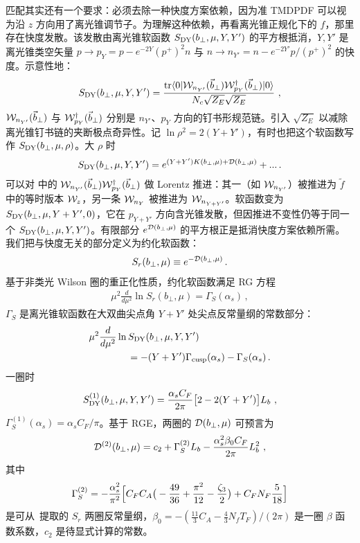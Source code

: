 匹配其实还有一个要求：必须去除一种快度方案依赖，因为准 TMDPDF 可以视为沿 $z$ 方向用了离光锥调节子。为理解这种依赖，再看离光锥正规化下的 $f$，那里存在快度发散。该发散由离光锥软函数 $S_{\rm DY}(b_\perp,\mu,Y,Y')$ 的平方根抵消，$Y,Y'$ 是离光锥类空矢量 $p\rightarrow p_Y= p-e^{-2Y}(p^+)^2n $ 与 $n \rightarrow n_{Y'}=n-e^{-2Y'}p/(p^+)^2$ 的快度。示意性地：
\begin{align}\label{eq:S_DY}
	S_{\rm DY}(b_\perp,\mu,Y,Y')= \frac{{\rm tr}\langle 0|{\cal W}_{n_{Y'}}(\vec{b}_\perp) {\cal W}^{\dagger}_{p_Y}(\vec{b}_\perp)|0\rangle}{N_c\sqrt{Z_E}\sqrt{Z_E}}  \ ,
\end{align}
${\cal W}_{n_{Y'}}(\vec{b}_\perp)$ 与 ${\cal W}^{\dagger}_{p_Y}(\vec{b}_\perp)$ 分别是 $n_{Y'}$、$p_Y$ 方向的钉书形规范链。引入 $\sqrt{Z_E}$ 以减除离光锥钉书链的夹断极点奇异性。记 $\ln \rho^2=2(Y+Y')$，有时也把这个软函数写作 $S_{\rm DY}(b_\perp,\mu,\rho)$。大 $\rho $ 时
\begin{align}
	S_{\rm DY}(b_\perp,\mu,Y,Y')= e^{(Y+Y') K(b_\perp,\mu)+{\cal D}(b_\perp,\mu)}+... \,.
\end{align}
可以对  中的 ${\cal W}_{n_{Y'}}(\vec{b}_\perp) {\cal W}^{\dagger}_{p_Y}(\vec{b}_\perp)$ 做 Lorentz 推进：其一（如 ${\cal W}_{n_{Y'}}$）被推进为 $\tilde f$ 中的等时版本 ${\cal W}_z$，另一条 ${\cal W}_{n_{Y}}$ 被推进为 ${\cal W}_{n_{Y+Y'}}$。软函数变为 $S_{\rm DY}(b_\perp,\mu,Y+Y',0)$，它在 $p_{Y+Y'}$ 方向含光锥发散，但因推进不变性仍等于同一个 $S_{\rm DY}(b_\perp,\mu,Y,Y')$。有限部分 $e^{{\cal D}(b_\perp,\mu)}$
的平方根正是抵消快度方案依赖所需。我们把与快度无关的部分定义为约化软函数：
\begin{align}\label{eq:reduced}
	S_r(b_\perp,\mu)\equiv e^{-{\cal D}(b_\perp,\mu)} \,.
\end{align}
基于非类光 Wilson 圈的重正化性质，约化软函数满足 RG 方程
\begin{align}
	\mu^2 \frac{d}{d\mu^2} \ln S_r(b_\perp,\mu)=\Gamma_S(\alpha_s) \,,
\end{align}
$\Gamma_S$ 是离光锥软函数在大双曲尖点角 $Y+Y'$ 处尖点反常量纲的常数部分：
\begin{align}
	&\mu^2 \frac{d}{d\mu^2} \ln S_{\rm DY}(b_\perp,\mu,Y,Y')\nonumber \\
	&\qquad\qquad=-(Y+Y')\Gamma_{\rm cusp}(\alpha_s)-\Gamma_S(\alpha_s)\,.
\end{align}
一圈时~\cite{Ebert:2019okf}
\begin{align}
	S^{(1)}_{\rm DY}(b_\perp,\mu,Y,Y')=\frac{\alpha_sC_F}{2\pi}\big[2-2(Y+Y')\big]L_b \ ,
\end{align}
$\Gamma_S^{(1)} (\alpha_s)= \alpha_s C_F/\pi$。基于 RGE，两圈的 ${\cal D}(b_\perp,\mu)$ 可预言为
\begin{align}
	{\cal D}^{(2)}(b_\perp,\mu)=c_2+\Gamma_S^{(2)}L_b-\frac{\alpha_s^2\beta_0C_F}{2\pi}L_b^2 \ ,
\end{align}
其中
\begin{align}
	\Gamma_S^{(2)}=-\frac{\alpha_s^2}{\pi^2}\Big[C_FC_A\big(-\frac{49}{36}+\frac{\pi^2}{12}-\frac{\zeta_3}{2}\big)+C_FN_F\frac{5}{18}\Big]\nonumber
\end{align}
是可从~\cite{Grozin:2015kna}提取的 $S_r$ 两圈反常量纲，$\beta_0=-\left(\frac{11}{3}C_A-\frac{4}{3}N_f T_F\right)/(2\pi)$ 是一圈 $\beta$ 函数系数，$c_2$ 是待显式计算的常数。

